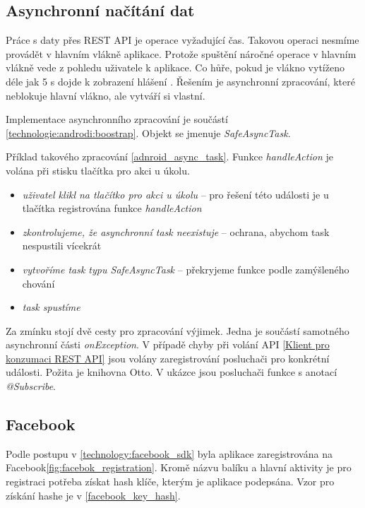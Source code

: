 \documentclass[thesis=B,czech]{FITthesis}[2012/06/26]
\begin{document}
\subsection{Asynchronní načítání dat}

Práce s daty přes REST API je operace vyžadující čas. Takovou operaci nesmíme provádět v hlavním vlákně aplikace\cite{android_threads}. Protože spuštění náročné operace v hlavním vlákně vede z pohledu uživatele k  aplikace. Co hůře, pokud je vlákno vytíženo déle jak 5 s dojde k zobrazení hlášení . Řešením je asynchronní zpracování, které neblokuje hlavní vlákno, ale vytváří si vlastní.

Implementace asynchronního zpracování je součástí \ref{technologie:androdi:boostrap}. Objekt se jmenuje \textit{SafeAsyncTask}.

Příklad takového zpracování \ref{adnroid_async_task}. Funkce \textit{handleAction} je volána při stisku tlačítka pro akci u úkolu. 
\begin{itemize}[nosep]
	\item \textit{uživatel klikl na tlačítko pro akci u úkolu} -- pro řešení této události je u tlačítka registrována funkce \textit{handleAction} 
	\item \textit{zkontrolujeme, že asynchronní task neexistuje} -- ochrana, abychom task nespustili vícekrát
	\item \textit{vytvoříme task typu SafeAsyncTask} -- překryjeme funkce podle zamýšleného chování
	\item \textit{task spustíme}
\end{itemize}

Za zmínku stojí dvě cesty pro zpracování výjimek. Jedna je součástí samotného asynchronní části \textit{onException}. V případě chyby při volání API \ref{Klient pro konzumaci REST API} jsou volány zaregistrování posluchači pro konkrétní události. Požita je knihovna Otto\cite{android_otto}. V ukázce jsou posluchači funkce s anotací \textit{@Subscribe}.



\subsection{Facebook}
\label{realization:android_facebook}

Podle postupu v \ref{technology:facebook_sdk} byla aplikace zaregistrována na Facebook\ref{fig:facebok_registration}. Kromě názvu balíku a hlavní aktivity\cite{android_launcher_activity} je pro registraci potřeba získat hash klíče, kterým je aplikace podepsána\cite{android_signing}. Vzor pro získání hashe je v \ref{facebook_key_hash}. 
\end{document}
